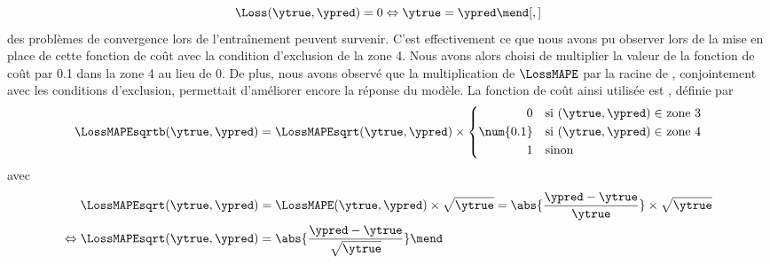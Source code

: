 \begin{equation}
\Loss(\ytrue, \ypred) = 0 \Leftrightarrow \ytrue = \ypred
\mend[,]
\end{equation}
des problèmes de convergence lors de l'entraînement peuvent survenir.
C'est effectivement ce que nous avons pu observer lors de la mise en place de cette fonction de coût
avec la condition d'exclusion de la zone 4.
Nous avons alors choisi de multiplier la valeur de la fonction de coût par \num{0.1} dans la zone 4 au lieu de 0.
De plus, nous avons observé que la multiplication de $\LossMAPE$ par la racine de \ytrue,
conjointement avec les conditions d'exclusion,
permettait d'améliorer encore la réponse du modèle.
La fonction de coût ainsi utilisée est
\LossMAPEsqrtb, définie par
\begin{equation}
\LossMAPEsqrtb(\ytrue, \ypred)
=
\LossMAPEsqrt(\ytrue, \ypred)
\times
\left\lbrace
\begin{aligned}
0 \quad & \text{si $(\ytrue, \ypred)\in$ zone 3}\\
\num{0.1} \quad & \text{si $(\ytrue, \ypred)\in$ zone 4}\\
1 \quad & \text{sinon}
\end{aligned}
\right.
\label{eq-LossMAPEsqrtb}
\end{equation}
avec
\begin{align}
\LossMAPEsqrt(\ytrue, \ypred)
&=
\LossMAPE(\ytrue, \ypred) \times \sqrt{\ytrue}
=
\abs{\frac{\ypred-\ytrue}{\ytrue}} \times \sqrt{\ytrue}
\nonumber\\\Leftrightarrow
\LossMAPEsqrt(\ytrue, \ypred)
&=
\abs{\frac{\ypred-\ytrue}{\sqrt{\ytrue}}}
\mend
\end{align}
